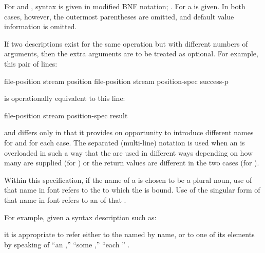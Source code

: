 For  and , syntax is given 
in modified BNF notation; \seesection\ModifiedBNF.
For  a  is given.
In both cases, however, the outermost parentheses are omitted,
and default value information is omitted.


If two descriptions exist for the same operation but with different numbers of
arguments, then the extra arguments are to be treated as optional.  For example,
this pair of lines:

\DefunWithValues file-position {stream} {position}
\DefunWithValues file-position {stream position-spec} {success-p}

\noindent is operationally equivalent to this line:

\DefunWithValues file-position {stream {\opt} position-spec} {result}

\noindent and differs only in that it provides on opportunity to introduce different
names for  and  for each case.
The separated (multi-line) notation is used when an  is overloaded in
such a way that the  are used in different ways
depending on how many  are supplied (\eg for \thefunction{/})
or the return values are different in the two cases (\eg for ).

\endsubsubsubsection%


Within this specification, 
if the name of a  is chosen to be a plural noun,
use of that name in  font refers
to the  to which the  is bound.
Use of the singular form of that name in  font refers 
to an  of that .

For example, given a syntax description such as:

 {{\rest} }

\noindent it is appropriate to refer either to the  named
 by name, or to one of its elements by speaking of ``an ,''
``some ,'' ``each '' \etc.

\endsubsubsubsection%


